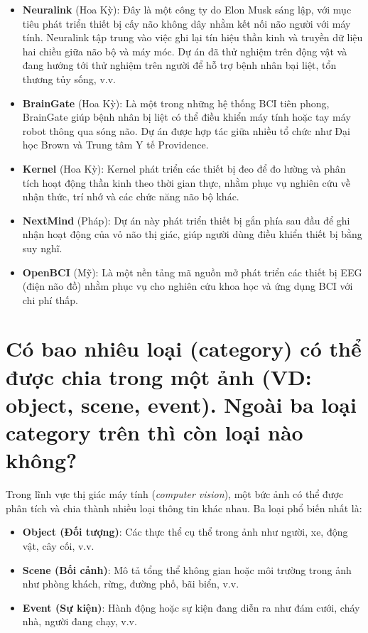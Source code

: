 \documentclass[12pt]{article}
\begin{document}
	\begin{itemize}
	\item \textbf{Neuralink} (Hoa Kỳ): 
	Đây là một công ty do Elon Musk sáng lập, với mục tiêu phát triển thiết bị cấy não không dây nhằm kết nối não người với máy tính. Neuralink tập trung vào việc ghi lại tín hiệu thần kinh và truyền dữ liệu hai chiều giữa não bộ và máy móc. Dự án đã thử nghiệm trên động vật và đang hướng tới thử nghiệm trên người để hỗ trợ bệnh nhân bại liệt, tổn thương tủy sống, v.v.
	
	\item \textbf{BrainGate} (Hoa Kỳ): 
	Là một trong những hệ thống BCI tiên phong, BrainGate giúp bệnh nhân bị liệt có thể điều khiển máy tính hoặc tay máy robot thông qua sóng não. Dự án được hợp tác giữa nhiều tổ chức như Đại học Brown và Trung tâm Y tế Providence.
	
	\item \textbf{Kernel} (Hoa Kỳ): 
	Kernel phát triển các thiết bị đeo để đo lường và phân tích hoạt động thần kinh theo thời gian thực, nhằm phục vụ nghiên cứu về nhận thức, trí nhớ và các chức năng não bộ khác.
	
	\item \textbf{NextMind} (Pháp): 
	Dự án này phát triển thiết bị gắn phía sau đầu để ghi nhận hoạt động của vỏ não thị giác, giúp người dùng điều khiển thiết bị bằng suy nghĩ.
	
	\item \textbf{OpenBCI} (Mỹ): 
	Là một nền tảng mã nguồn mở phát triển các thiết bị EEG (điện não đồ) nhằm phục vụ cho nghiên cứu khoa học và ứng dụng BCI với chi phí thấp.
	
	\end{itemize}
	
	\section{Có bao nhiêu loại (category) có thể được chia trong một ảnh (VD: object, scene, event). Ngoài ba loại category trên thì còn loại nào không?}
	
	Trong lĩnh vực thị giác máy tính (\textit{computer vision}), một bức ảnh có thể được phân tích và chia thành nhiều loại thông tin khác nhau. Ba loại phổ biến nhất là:
	
	\begin{itemize}
	\item \textbf{Object (Đối tượng)}: Các thực thể cụ thể trong ảnh như người, xe, động vật, cây cối, v.v.
	\item \textbf{Scene (Bối cảnh)}: Mô tả tổng thể không gian hoặc môi trường trong ảnh như phòng khách, rừng, đường phố, bãi biển, v.v.
	\item \textbf{Event (Sự kiện)}: Hành động hoặc sự kiện đang diễn ra như đám cưới, cháy nhà, người đang chạy, v.v.
	\end{itemize}
	
\end{document}
